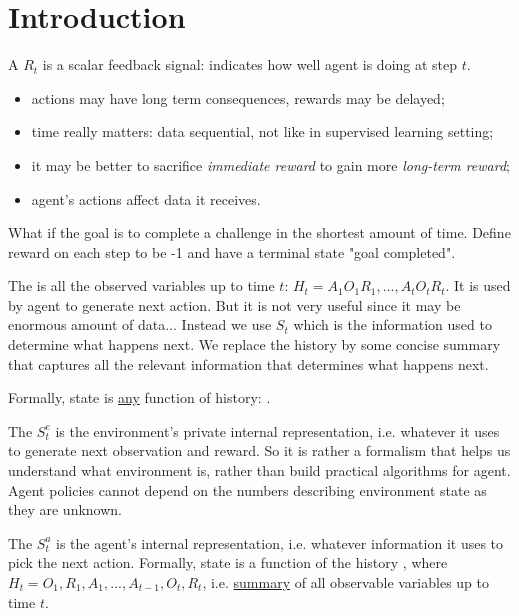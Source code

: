 \section{Introduction}

A  $R_t$ is a scalar feedback signal: indicates how well agent is doing at step $t$. 
\begin{itemize}
	\item actions may have long term consequences, rewards may be delayed;
	\item time really matters: data sequential, not \iid like in supervised learning setting;
	\item it may be better to sacrifice \textit{immediate reward} to gain more \textit{long-term reward};
	\item agent's actions affect data it receives.
\end{itemize}

\begin{notebox}
	What if the goal is to complete a challenge in the shortest amount of time. Define reward on each step to be -1 and have a terminal state "goal completed".
\end{notebox}

The  is all the observed variables up to time $t$: $H_t = A_1 O_1 R_1, ..., A_t O_t R_t$. It is used by agent to generate next action. But it is not very useful since it may be enormous amount of data... Instead we use  $S_t$ which is the information used to determine what happens next. We replace the history by some concise summary that captures all the relevant information that determines what happens next.

Formally, state is \underline{any} function of history: .

The  $S^e_t$ is the environment's private internal representation, i.e. whatever it uses to generate next observation and reward.  So it is rather a formalism that helps us understand what environment is, rather than build practical algorithms for agent. Agent policies cannot depend on the numbers describing environment state as they are unknown.

The  $S^a_t$ is the agent's internal representation, i.e. whatever information it uses to pick the next action. Formally, state is a function of the history , where $H_t = O_1, R_1, A_1, ..., A_{t-1}, O_{t}, R_{t}$, i.e. \underline{summary} of all observable variables up to time $t$. 

